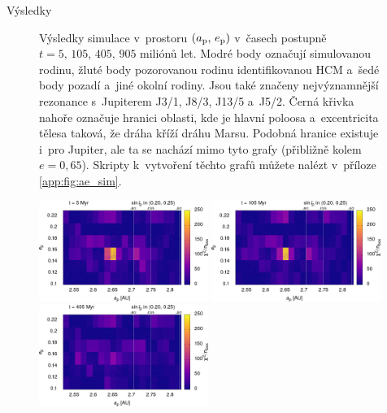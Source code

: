 \documentclass{beamer}
\newlength{\vyskaB}
\newlength{\main}
\begin{document}
\begin{frame}
\begin{columns}[t]
\begin{column}{\main}
\begin{block}{Výsledky\phantom{Úy}}
\begin{minipage}[t][1.0\vyskaB][t]{\textwidth}
\begin{figure}[t]
				\caption{Výsledky simulace v~prostoru $(a_{\rm p},\,e_{\rm p})$ v~časech postupně $t=5,\,105,\,405,\,905$ miliónů let. Modré body označují simulovanou rodinu, žluté body pozorovanou rodinu identifikovanou HCM a~šedé body pozadí a~jiné okolní rodiny. Jsou také značeny nejvýznamnější rezonance s~Jupiterem J3/1, J8/3, J13/5 a~J5/2. Černá křivka nahoře označuje hranici oblasti, kde je hlavní poloosa a~excentricita tělesa taková, že dráha kříží dráhu Marsu. Podobná hranice existuje i~pro Jupiter, ale ta se nachází mimo tyto grafy (přibližně kolem $e=0,65$). Skripty k~vytvoření těchto grafů můžete nalézt v~příloze \ref{app:fig:ae_sim}.} \label{fig:ae_sim}
			\end{figure}	

			\immediate{}
			\immediate{}
			\immediate{}
			\immediate{}
			\begin{figure}
				\centering
				\includegraphics[width=0.49\textwidth]{../obr/ae_chi_0006t.png}
				\includegraphics[width=0.49\textwidth]{../obr/ae_chi_0106t.png}\\
				\includegraphics[width=0.49\textwidth]{../obr/ae_chi_0406t.png}

\end{figure}
\end{minipage}
\end{block}
\end{column}
\end{columns}
\end{frame}
\end{document}
